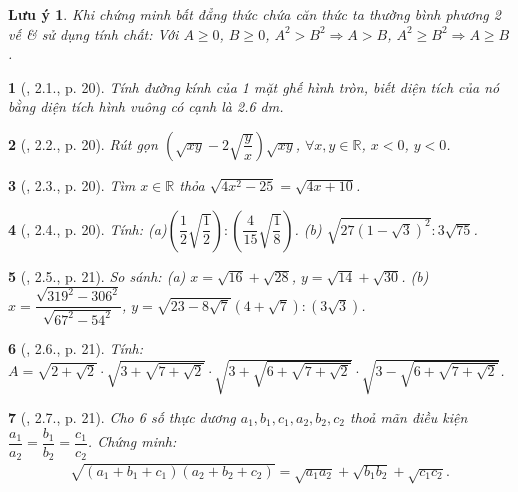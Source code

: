 \documentclass{article}
\newtheorem{baitoan}{}
\newtheorem{luuy}{Lưu ý}
\begin{document}
\begin{luuy}
	Khi chứng minh bất đẳng thức chứa căn thức ta thường bình phương 2 vế \& sử dụng tính chất: Với $A\ge0$, $B\ge0$, $A^2 > B^2\Rightarrow A > B$, $A^2\ge B^2\Rightarrow A\ge B$.
\end{luuy}

\begin{baitoan}[\cite{Binh_boi_duong_Toan_9_tap_1}, 2.1., p. 20]
	Tính đường kính của 1 mặt ghế hình tròn, biết diện tích của nó bằng diện tích hình vuông có cạnh là {\rm2.6 dm}.
\end{baitoan}

\begin{baitoan}[\cite{Binh_boi_duong_Toan_9_tap_1}, 2.2., p. 20]
	Rút gọn $\left(\sqrt{xy} - 2\sqrt{\dfrac{y}{x}}\right)\sqrt{xy}$, $\forall x,y\in\mathbb{R}$, $x < 0$, $y < 0$.
\end{baitoan}

\begin{baitoan}[\cite{Binh_boi_duong_Toan_9_tap_1}, 2.3., p. 20]
	Tìm $x\in\mathbb{R}$ thỏa $\sqrt{4x^2 - 25} = \sqrt{4x + 10}$.
\end{baitoan}

\begin{baitoan}[\cite{Binh_boi_duong_Toan_9_tap_1}, 2.4., p. 20]
	Tính: (a)$\left(\dfrac{1}{2}\sqrt{\dfrac{1}{2}}\right):\left(\dfrac{4}{15}\sqrt{\dfrac{1}{8}}\right)$. (b) $\sqrt{27(1 - \sqrt{3})^2}:3\sqrt{75}$.
\end{baitoan}

\begin{baitoan}[\cite{Binh_boi_duong_Toan_9_tap_1}, 2.5., p. 21]
	So sánh: (a) $x = \sqrt{16} + \sqrt{28}$, $y = \sqrt{14} + \sqrt{30}$. (b) $x = \dfrac{\sqrt{319^2 - 306^2}}{\sqrt{67^2 - 54^2}}$, $y = \sqrt{23 - 8\sqrt{7}}(4 + \sqrt{7}):(3\sqrt{3})$.
\end{baitoan}

\begin{baitoan}[\cite{Binh_boi_duong_Toan_9_tap_1}, 2.6., p. 21]
	Tính: $A = \sqrt{2 + \sqrt{2}}\cdot\sqrt{3 + \sqrt{7 + \sqrt{2}}}\cdot\sqrt{3 + \sqrt{6 + \sqrt{7 + \sqrt{2}}}}\cdot\sqrt{3 - \sqrt{6 + \sqrt{7 + \sqrt{2}}}}$.
\end{baitoan}

\begin{baitoan}[\cite{Binh_boi_duong_Toan_9_tap_1}, 2.7., p. 21]
	Cho 6 số thực dương $a_1,b_1,c_1,a_2,b_2,c_2$ thoả mãn điều kiện $\dfrac{a_1}{a_2} = \dfrac{b_1}{b_2} = \dfrac{c_1}{c_2}$. Chứng minh:
	\begin{align*}
		\sqrt{(a_1 + b_1 + c_1)(a_2 + b_2 + c_2)} = \sqrt{a_1a_2} + \sqrt{b_1b_2} + \sqrt{c_1c_2}.
	\end{align*}
\end{baitoan}
\end{document}
